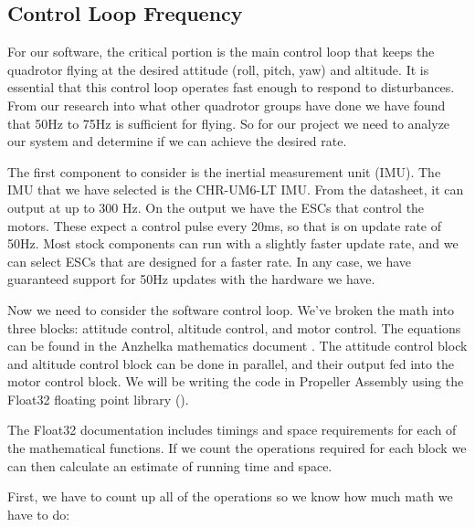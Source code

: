 \documentclass{article}
\numberwithin{equation}{section} %
\begin{document}
\subsection{Control Loop Frequency} \label{subsec:codeperformanceestimation}

For our software, the critical portion is the main control loop that keeps the quadrotor flying at the desired attitude (roll, pitch, yaw) and altitude. It is essential that this control loop operates fast enough to respond to disturbances. From our research into what other quadrotor groups have done we have found that 50Hz to 75Hz is sufficient for flying. So for our project we need to analyze our system and determine if we can achieve the desired rate.

The first component to consider is the inertial measurement unit (IMU). The IMU that we have selected is the CHR-UM6-LT IMU. From the datasheet, it can output at up to 300 Hz. On the output we have the ESCs that control the motors. These expect a control pulse every 20ms, so that is on update rate of 50Hz. Most stock components can run with a slightly faster update rate, and we can select ESCs that are designed for a faster rate. In any case, we have guaranteed support for 50Hz updates with the hardware we have.

Now we need to consider the software control loop. We've broken the math into three blocks: attitude control, altitude control, and motor control. The equations can be found in the Anzhelka mathematics document \cite{anzhelka_math}. The attitude control block and altitude control block can be done in parallel, and their output fed into the motor control block. We will be writing the code in Propeller Assembly using the Float32 floating point library (\cite{float32}).

The Float32 documentation includes timings and space requirements for each of the mathematical functions. If we count the operations required for each block we can then calculate an estimate of running time and space.

First, we have to count up all of the operations so we know how much math we have to do:
\end{document}

